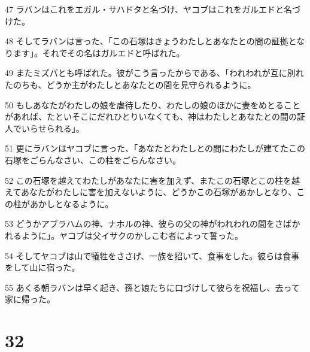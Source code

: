 \par 47 ラバンはこれをエガル・サハドタと名づけ、ヤコブはこれをガルエドと名づけた。
\par 48 そしてラバンは言った、「この石塚はきょうわたしとあなたとの間の証拠となります」。それでその名はガルエドと呼ばれた。
\par 49 またミズパとも呼ばれた。彼がこう言ったからである、「われわれが互に別れたのちも、どうか主がわたしとあなたとの間を見守られるように。
\par 50 もしあなたがわたしの娘を虐待したり、わたしの娘のほかに妻をめとることがあれば、たといそこにだれひとりいなくても、神はわたしとあなたとの間の証人でいらせられる」。
\par 51 更にラバンはヤコブに言った、「あなたとわたしとの間にわたしが建てたこの石塚をごらんなさい、この柱をごらんなさい。
\par 52 この石塚を越えてわたしがあなたに害を加えず、またこの石塚とこの柱を越えてあなたがわたしに害を加えないように、どうかこの石塚があかしとなり、この柱があかしとなるように。
\par 53 どうかアブラハムの神、ナホルの神、彼らの父の神がわれわれの間をさばかれるように」。ヤコブは父イサクのかしこむ者によって誓った。
\par 54 そしてヤコブは山で犠牲をささげ、一族を招いて、食事をした。彼らは食事をして山に宿った。
\par 55 あくる朝ラバンは早く起き、孫と娘たちに口づけして彼らを祝福し、去って家に帰った。

\chapter{32}

